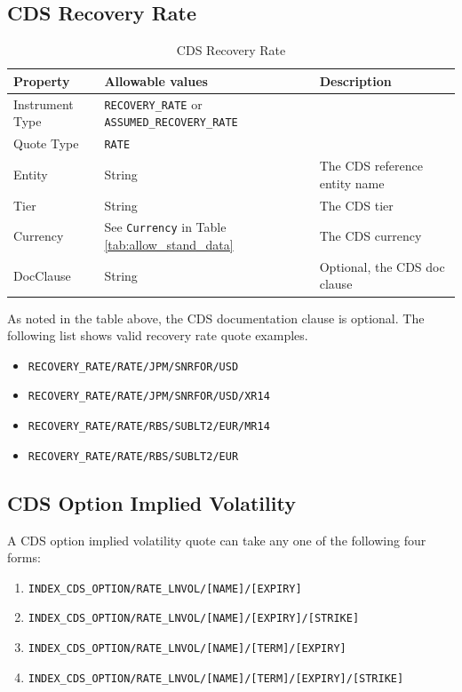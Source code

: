 \subsection{CDS Recovery Rate}
\label{md:cds_recovery_rate_quote}

\begin{table}[H]
\centering
  \begin{tabular}{|p{3cm}|p{3.5cm}|p{7cm}|}
    \hline
    {\bf Property} & {\bf Allowable values} & {\bf Description} \\ \hline
    Instrument Type & \lstinline!RECOVERY_RATE! or \lstinline!ASSUMED_RECOVERY_RATE! & \\ \hline
    Quote Type & \lstinline!RATE! & \\ \hline
    Entity & String & The CDS reference entity name \\ \hline
    Tier & String & The CDS tier \\ \hline
    Currency & See \lstinline!Currency! in Table \ref{tab:allow_stand_data} & The CDS currency\\ \hline
    DocClause & String & Optional, the CDS doc clause \\ \hline
  \end{tabular}
  \caption{CDS Recovery Rate}
  \label{tab:cdsrecovery_quote}
\end{table}

As noted in the table above, the CDS documentation clause is optional. The following list shows valid recovery rate quote examples.
\begin{itemize}
\item \lstinline!RECOVERY_RATE/RATE/JPM/SNRFOR/USD!
\item \lstinline!RECOVERY_RATE/RATE/JPM/SNRFOR/USD/XR14!
\item \lstinline!RECOVERY_RATE/RATE/RBS/SUBLT2/EUR/MR14!
\item \lstinline!RECOVERY_RATE/RATE/RBS/SUBLT2/EUR!
\end{itemize}

\subsection{CDS Option Implied Volatility}
\label{md:cds_option_iv}

A CDS option implied volatility quote can take any one of the following four forms:

\begin{enumerate}
\item \lstinline!INDEX_CDS_OPTION/RATE_LNVOL/[NAME]/[EXPIRY]!
\item \lstinline!INDEX_CDS_OPTION/RATE_LNVOL/[NAME]/[EXPIRY]/[STRIKE]!
\item \lstinline!INDEX_CDS_OPTION/RATE_LNVOL/[NAME]/[TERM]/[EXPIRY]!
\item \lstinline!INDEX_CDS_OPTION/RATE_LNVOL/[NAME]/[TERM]/[EXPIRY]/[STRIKE]!
\end{enumerate}

